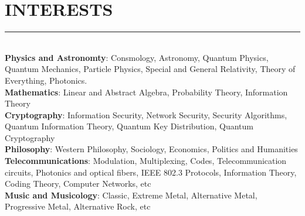 \documentclass[10pt,a4paper]{article}
\begin{document}
\section{INTERESTS}
\noindent \rule {18.0cm}{0.2pt} \\
\textbullet \hspace{0.1cm} \textbf{Physics and Astronomty}: Consmology, Astronomy, Quantum Physics, Quantum Mechanics, Particle Physics, Special and General Relativity, Theory of Everything, Photonics. \\
\textbullet \hspace{0.1cm} \textbf{Mathematics}: Linear and Abstract Algebra, Probability Theory, Information Theory \\
\textbullet \hspace{0.1cm} \textbf{Cryptography}: Information Security, Network Security, Security Algorithms, Quantum Information Theory, Quantum Key Distribution, Quantum Cryptography \\
\textbullet \hspace{0.1cm} \textbf{Philosophy}: Western Philosophy, Sociology, Economics, Politics and Humanities \\
\textbullet \hspace{0.1cm} \textbf{Telecommunications}: Modulation, Multiplexing, Codes, Telecommunication circuits, Photonics and optical fibers, IEEE 802.3 Protocols, Information Theory, Coding Theory, Computer Networks, etc \\
\textbullet \hspace{0.1cm} \textbf{Music and Musicology}: Classic, Extreme Metal, Alternative Metal, Progressive Metal, Alternative Rock, etc
\end{document}
